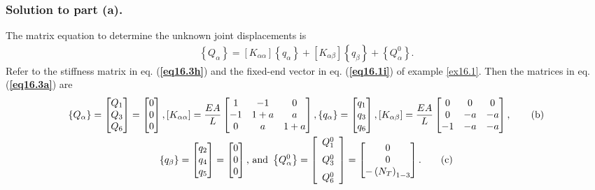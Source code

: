 \documentclass{AeroStructure-ERJohnson}
\begin{document}
\begin{example}
\subsubsection{Solution to part (a).} The matrix equation to determine the unknown joint displacements is
\begin{align}\label{eq16.3a}\tag{a}
\left\{Q_{\alpha}\right\}=\left[K_{\alpha \alpha}\right]\left\{q_{\alpha}\right\}+\left[K_{\alpha \beta}\right]\left\{q_{\beta}\right\}+\left\{Q_{\alpha}^{0}\right\}.
\end{align}
Refer to the stiffness matrix in eq. (\textbf{\ref{eq16.3h}}) and the fixed-end vector in eq. (\textbf{\ref{eq16.1i}}) of example \ref{ex16.1}. Then the matrices in eq. (\textbf{\ref{eq16.3a}}) are
\begin{gather}
\left\{Q_{\alpha}\right\}=\left[\begin{array}{@{}c@{}}Q_{1} \\Q_{3} \\Q_{6}\end{array}\right]=\left[\begin{array}{@{}l@{}}0 \\0 \\0\end{array}\right], \left[K_{\alpha \alpha}\right]=\frac{E A}{L}\left[\begin{array}{@{}ccc@{}}1 & -1 & 0 \\-1 & 1+a & a \\0 & a & 1+a\end{array}\right], \left\{q_{\alpha}\right\}=\left[\begin{array}{@{}l@{}}q_{1} \\q_{3} \\q_{6}\end{array}\right], \left[K_{\alpha \beta}\right]=\frac{E A}{L}\left[\begin{array}{@{}ccc@{}}0 & 0 & 0 \\0 & -a & -a \\-1 & -a & -a\end{array}\right],\label{eq16.3b}\tag{b}\\
\left\{q_{\beta}\right\}=\left[\begin{array}{@{}l@{}}q_{2} \\q_{4} \\q_{5}\end{array}\right]=\left[\begin{array}{@{}l@{}}0 \\0 \\0\end{array}\right]\mbox{, and }\left\{Q_{\alpha}^{0}\right\}=\left[\begin{array}{r}Q_{1}^{0} \\[6pt] Q_{3}^{0} \\[6pt] Q_{6}^{0}\end{array}\right]=\left[\begin{array}{@{}c@{}}0 \\0 \\-\left(N_{T}\right)_{1-3}\end{array}\right].\label{eq16.3c}\tag{c}

\end{gather}
\end{example}
\end{document}
